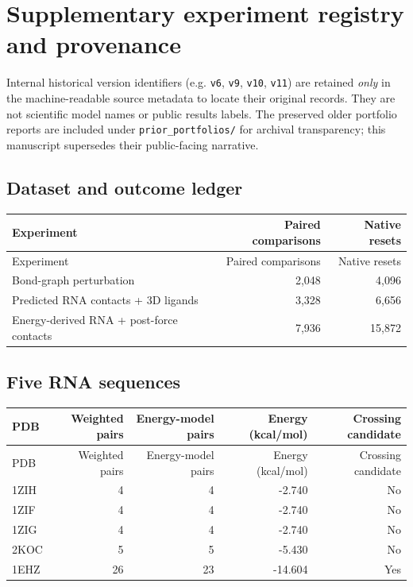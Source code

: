 \documentclass[10pt,a4paper]{article}
\begin{document}
\section{Supplementary experiment registry and provenance}
Internal historical version identifiers (e.g. \texttt{v6}, \texttt{v9}, \texttt{v10}, \texttt{v11}) are retained \emph{only} in the machine-readable source metadata to locate their original records. They are not scientific model names or public results labels. The preserved older portfolio reports are included under \texttt{prior\_portfolios/} for archival transparency; this manuscript supersedes their public-facing narrative.
\subsection{Dataset and outcome ledger}
\begin{center}\small\begin{longtable}{lrr}
\toprule
Experiment & Paired comparisons & Native resets\\
\midrule
\endfirsthead
\toprule
Experiment & Paired comparisons & Native resets\\
\midrule
\endhead
Bond-graph perturbation & 2,048 & 4,096\\
Predicted RNA contacts + 3D ligands & 3,328 & 6,656\\
Energy-derived RNA + post-force contacts & 7,936 & 15,872\\
\bottomrule
\end{longtable}
\end{center}
\subsection{Five RNA sequences}
\begin{center}\small\begin{longtable}{lrrrr}
\toprule
PDB & Weighted pairs & Energy-model pairs & Energy (kcal/mol) & Crossing candidate\\
\midrule
\endfirsthead
\toprule
PDB & Weighted pairs & Energy-model pairs & Energy (kcal/mol) & Crossing candidate\\
\midrule
\endhead
1ZIH & 4 & 4 & -2.740 & No\\
1ZIF & 4 & 4 & -2.740 & No\\
1ZIG & 4 & 4 & -2.740 & No\\
2KOC & 5 & 5 & -5.430 & No\\
1EHZ & 26 & 23 & -14.604 & Yes\\
\bottomrule
\end{longtable}
\end{center}
\end{document}
